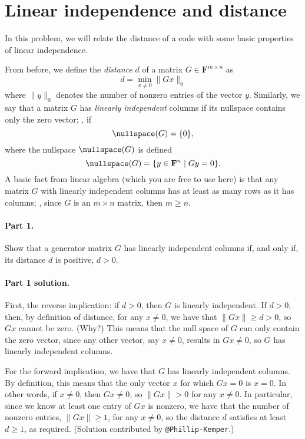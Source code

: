 \documentclass[12pt,hidelinks]{article}
\newcommand{\field}{\mathbf{F}}
\begin{document}
\section{Linear independence and distance}
In this problem, we will relate the distance of a code with some basic
properties of linear independence.

From before, we define the \emph{distance} $d$ of a matrix $G \in \field^{m\times n}$
as
\[
    d = \min_{x \ne 0} \|Gx\|_0
\]
where $\|y\|_0$ denotes the number of nonzero entries of the vector $y$.
Similarly, we say that a matrix $G$ has \emph{linearly independent} columns if
its nullspace contains only the zero vector; \ie, if
\[
    \nullspace(G) = \{0\},
\]
where the nullspace $\nullspace(G)$ is defined
\[
    \nullspace(G) = \{y \in \field^n \mid Gy = 0\}.
\]
A basic fact from linear algebra (which you are free to use here) is that any
matrix $G$ with linearly independent columns has at least as many rows as it
has columns; \ie, since $G$ is an $m\times n$ matrix, then $m \ge n$.

\paragraph{Part 1.} Show that a generator matrix $G$ has linearly independent
columns if, and only if, its distance $d$ is positive, $d > 0$.

\begin{solution}
\paragraph{Part 1 solution.} First, the reverse implication: if $d > 0$, then
$G$ is linearly independent. If $d > 0$, then, by definition of distance, for
any $x \ne 0$, we have that $\|Gx\| \ge d > 0$, so $Gx$ cannot be zero. (Why?)
This means that the null space of $G$ can only contain the zero vector, since
any other vector, say $x \ne 0$, results in $Gx \ne 0$, so $G$ has linearly
independent columns.

For the forward implication, we have that $G$ has linearly independent columns.
By definition, this means that the only vector $x$ for which $Gx = 0$ is $x =
0$. In other words, if $x \ne 0$, then $Gx \ne 0$, so $\|Gx\| > 0$ for any $x
\ne 0$. In particular, since we know at least one entry of $Gx$ is nonzero, we
have that the number of nonzero entries, $\|Gx\| \ge 1$, for any $x\ne 0$, so
the distance $d$ satisfies at least $d \ge 1$, as required.
(Solution contributed by \verb|@Phillip-Kemper|.)

\end{solution}
\end{document}
